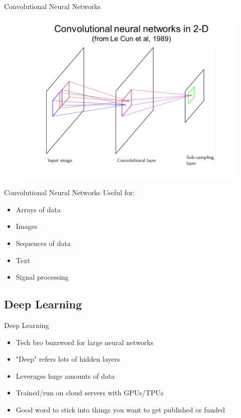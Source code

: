 \documentclass{beamer}
\begin{document}
            \begin{frame}{Convolutional Neural Networks}
                \begin{figure}
                    \centering
                    \includegraphics[scale=0.35]{nn-conv.jpg}
                \end{figure}                 
            \end{frame}
            
            \begin{frame}{Convolutional Neural Networks}
                Useful for:
                \begin{itemize}
                    \item<2-> Arrays of data
                    \item<3-> Images
                    \item<4-> Sequences of data
                    \item<5-> Text
                    \item<6-> Signal processing
                \end{itemize}
            \end{frame}
        
        \subsection{Deep Learning}
        
            \begin{frame}{Deep Learning}
                \begin{itemize}
                    \item<2-> Tech bro buzzword for large neural networks
                    \item<3-> "Deep" refers lots of hidden layers
                    \item<4-> Leverages huge amounts of data
                    \item<5-> Trained/run on cloud servers with GPUs/TPUs
                    \item<6-> Good word to stick into things you want to get published or funded
                \end{itemize}                 
            \end{frame}
        
\end{document}
